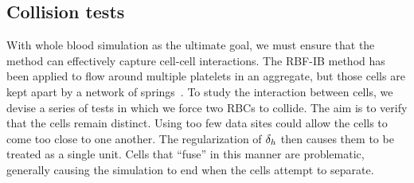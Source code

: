 \subsection{Collision tests}

With whole blood simulation as the ultimate goal, we must ensure that the method can
effectively capture cell-cell interactions. The RBF-IB method has been applied to flow
around multiple platelets in an aggregate, but those cells are kept apart by a network
of springs~\cite{Shankar:2015km}. To study the interaction between cells, we devise a
series of tests in which we force two RBCs to collide. The aim is to verify that the
cells remain distinct. Using too few data sites could allow the cells to come too close
to one another. The regularization of $\delta_h$ then causes them to be treated as a
single unit. Cells that ``fuse'' in this manner are problematic, generally causing the
simulation to end when the cells attempt to separate.

